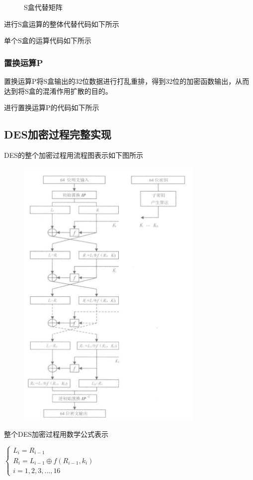\documentclass[a4paper,11pt,UTF8]{ctexart}
\newcommand{\bottomcaption}{%
\setlength{\abovecaptionskip}{6pt}%
\setlength{\belowcaptionskip}{6pt}%
\caption}
\newcommand{\xiaowuhao}{\fontsize{9pt}{\baselineskip}\selectfont}   %
\begin{document}
\begin{figure}[H]
\begin{subfigure}[b]{0.4\textwidth}
                    \label{fig:subfig2}
                \end{subfigure}
                \caption{S盒代替矩阵}
                \label{fig:subfigures}
            \end{figure}
            进行S盒运算的整体代替代码如下所示
            
            单个S盒的运算代码如下所示
            
\newpage
        \subsubsection{置换运算P}
            置换运算P将S盒输出的32位数据进行打乱重排，得到32位的加密函数输出，从而达到将S盒的混淆作用扩散的目的。\par
            进行置换运算P的代码如下所示
            
\newpage
    \subsection{DES加密过程完整实现}
        DES的整个加密过程用流程图表示如下图所示
        \begin{figure}[H]
            \centering
            \includegraphics[width=9cm]{DES_1.jpg}
            \bottomcaption{\xiaowuhao{DES整体流程图}}
        \end{figure}
        整个DES加密过程用数学公式表示\par
        $\begin{cases}
            L_{i}=R_{i-1}\\ R_{i}=L_{i-1}\oplus f\left( R_{i-1},k_{i}\right) \\ i=1,2,3,\ldots ,16
        \end{cases}$
\end{document}
